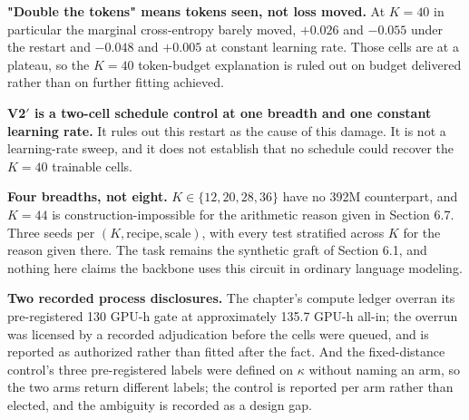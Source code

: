 \textbf{"Double the tokens" means tokens seen, not loss moved.} At $K{=}40$
in particular the marginal cross-entropy barely moved, $+0.026$ and
$-0.055$ under the restart and $-0.048$ and $+0.005$ at constant
learning rate. Those cells are at a plateau, so the $K{=}40$
token-budget explanation is ruled out on budget delivered rather than on
further fitting achieved.

\textbf{V2$'$ is a two-cell schedule control at one breadth and one constant
learning rate.} It rules out this restart as the cause of this damage.
It is not a learning-rate sweep, and it does not establish that no
schedule could recover the $K{=}40$ trainable cells.

\textbf{Four breadths, not eight.} $K \in \{12, 20, 28, 36\}$ have no 392M
counterpart, and $K{=}44$ is construction-impossible for the arithmetic
reason given in Section 6.7. Three seeds per $(K, \mathrm{recipe},
\mathrm{scale})$, with every test stratified across $K$ for the reason
given there. The task remains the synthetic graft of Section 6.1, and
nothing here claims the backbone uses this circuit in ordinary language
modeling.

\textbf{Two recorded process disclosures.} The chapter's compute ledger
overran its pre-registered 130 GPU-h gate at approximately 135.7 GPU-h
all-in; the overrun was licensed by a recorded adjudication before the
cells were queued, and is reported as authorized rather than fitted
after the fact. And the fixed-distance control's three pre-registered
labels were defined on $\kappa$ without naming an arm, so the two arms
return different labels; the control is reported per arm rather than
elected, and the ambiguity is recorded as a design gap.

